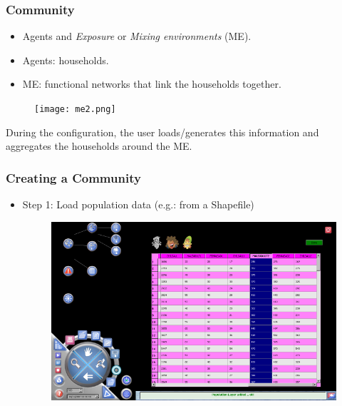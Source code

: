 \documentclass[hyperref={pdfpagelabels=true}]{beamer}
\begin{document}
\begin{frame}
\frametitle{Community}
\begin{itemize}
\item Agents and \textit{Exposure} or \textit{Mixing environments} (ME).
\item Agents: households.
\item ME: functional networks that link the households together. 
\end{itemize}
\begin{figure}
\texttt{[image: me2.png]}
\end{figure}
During the configuration, the user loads/generates this information and aggregates the households around the ME.
\end{frame}

\begin{frame}
\frametitle{Creating a Community}
\begin{itemize}
\item Step 1: Load population data (e.g.: from a Shapefile)
\begin{figure}
\includegraphics[scale=0.4]{load_population.png}
\end{figure}
\end{itemize}
\end{frame}
\end{document}
